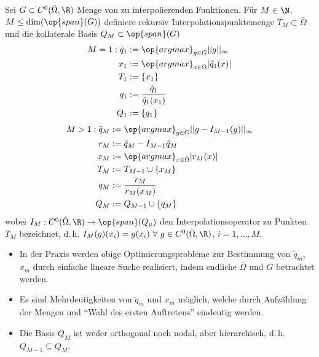 \begin{defn} \label{4.1}
	Sei $G \subset C^0(\bar{\Omega},\R)$ Menge von zu interpolierenden Funktionen. Für $M \in \N$, $M \leq \dim(\op{span}(G))$ definiere rekursiv Interpolationspunktemenge $T_{M} \subset \bar{\Omega}$ und die kollaterale Basis $Q_{M} \subset \op{span} (G)$
	\begin{align*}
	M = 1: \tilde{q}_1 &:= \op{argmax}_{g \in G} ||g||_{\infty} \\
	x_1 &:= \op{argmax}_{x \in \bar{\Omega}} |\tilde{q}_1 (x)| \\
	T_1 &:= \{x_1\} \\
	q_1 &:= \frac{\tilde{q}_1}{\tilde{q}_1 (x_1)} \\
	Q_1 &:= \{q_1\}
	\end{align*}
	\begin{align*}
	M > 1: \tilde{q}_M &:= \op{argmax}_{g \in G} ||g-I_{M-1}(g)||_{\infty} \\
	r_M &:= \tilde{q}_M - I_{M-1} \tilde{q}_M \\
	x_M &:= \op{argmax}_{x \in \bar{\Omega}} |r_M (x)| \\
	T_M &:= T_{M-1} \cup \{x_M\} \\
	q_M &:= \frac{r_M}{r_M (x_{M})} \\
	Q_M &:= Q_{M-1} \cup \{ q_M \}
	\end{align*}
	wobei $I_M : C^0(\bar{\Omega},\R) \rightarrow \op{span}(Q_{\mu})$ den Interpolationsoperator zu Punkten $T_M$ bezeichnet, d.\,h. $I_M(g)(x_i) = g(x_i) \,\, \forall \,\, g \in C^0(\bar{\Omega},\R)$, $i=1,\dots,M$.
\end{defn}

\begin{bem} \beginwithlistbem
	\begin{itemize}
		\item In der Praxis werden obige Optimierungsprobleme zur Bestimmung von $\tilde{q}_m$, $x_m$ durch einfache lineare Suche realisiert, indem endliche $\bar{\Omega}$ und $G$ betrachtet werden.
		\item Es sind Mehrdeutigkeiten von  $\tilde{q}_m$ und $x_m$ möglich, welche durch Aufzählung der Mengen und ``Wahl des ersten Auftretens'' eindeutig werden.
		\item Die Basis $Q_M$ ist weder orthogonal noch nodal, aber hierarchisch, d.\,h. $Q_{M-1} \subseteq Q_M$.
	\end{itemize}
\end{bem}

